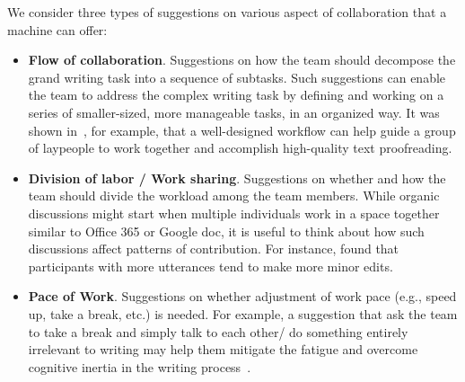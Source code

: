 We consider three types of suggestions on various aspect of collaboration that a machine can offer:


\begin{itemize}[leftmargin=*]
	\item {\bf Flow of collaboration}. Suggestions on how the team should decompose the grand writing task into a sequence of subtasks. Such suggestions can enable the team to address the complex writing task by defining and working on a series of smaller-sized, more manageable tasks, in an organized way. It was shown in~\citet{bernstein2010soylent}, for example, that a well-designed workflow can help guide a group of laypeople to work together and accomplish high-quality text proofreading. 
	\item {\bf Division of labor / Work sharing}. Suggestions on whether and how the team should divide the workload among the team members. 
    While organic discussions might start when multiple individuals work in a space together similar to Office 365 or Google doc,
    it is useful to think about how such discussions affect patterns of contribution.
    For instance, \citet{birnholtz2013write} found that participants with more utterances tend to make more minor edits.
	\item {\bf Pace of Work}. Suggestions on whether adjustment of work pace (e.g., speed up, take a break, etc.) is needed. For example, a suggestion that ask the team to take a break and simply talk to each other/ do something entirely irrelevant to writing may help them mitigate the fatigue and overcome cognitive inertia in the writing process~\citep{dai2015and}.


\end{itemize}
